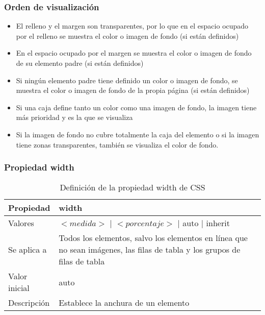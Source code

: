 \begin{frame}
\frametitle{Orden de visualización}

\begin{itemize}
  \item El relleno y el margen son transparentes, por lo que en el espacio ocupado por el relleno se muestra el color o imagen de fondo (si están definidos)
  \item En el espacio ocupado por el margen se muestra el color o imagen de fondo de su elemento padre (si están definidos)
  \item Si ningún elemento padre tiene definido un color o imagen de fondo, se muestra el color o imagen de fondo de la propia página (si están definidos)
  \item Si una caja define tanto un color como una imagen de fondo, la imagen tiene más prioridad y es la que se visualiza
  \item Si la imagen de fondo no cubre totalmente la caja del elemento o si la imagen tiene zonas transparentes, también se visualiza el color de fondo. 
\end{itemize}

\end{frame}


\begin{frame}
\frametitle{Propiedad width}

\begin{center}
  \begin{table}
   \begin{tabular}{p{1.8cm}p{7.8cm}}
Propiedad &\bf{width} \\ \hline
Valores & $<medida>$ | $<porcentaje>$ | auto | inherit \\ \hline
Se aplica a & Todos los elementos, salvo los elementos en línea que no sean imágenes, las filas de tabla y los grupos de filas de tabla \\ \hline
Valor inicial & auto \\ \hline
Descripción & Establece la anchura de un elemento \\ \hline
  \end{tabular}
   \caption{Definición de la propiedad width de CSS}
 \end{table}
\end{center}

\end{frame}


